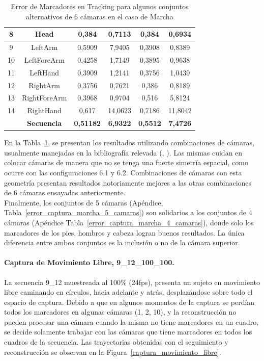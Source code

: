\begin{table}[ht!]
{\begin{tabular}{c|c|c|c|c|c|}
\multicolumn{1}{|c|}{8} & Head & 0,384 & 0,7113 & 0,384 & 0,6934 \\ \hline
\multicolumn{1}{|c|}{9} & LeftArm & 0,5909 & 7,9405 & 0,3908 & 0,8389 \\ \hline
\multicolumn{1}{|c|}{10} & LeftForeArm & 0,4258 & 1,7149 & 0,3895 & 0,9638 \\ \hline
\multicolumn{1}{|c|}{11} & LeftHand & 0,3909 & 1,2141 & 0,3756 & 1,0439 \\ \hline
\multicolumn{1}{|c|}{12} & RightArm & 0,3756 & 0,7621 & 0,386 & 0,8189 \\ \hline
\multicolumn{1}{|c|}{13} & RightForeArm & 0,3968 & 0,9704 & 0,516 & 5,8124 \\ \hline
\multicolumn{1}{|c|}{14} & RightHand & 0,617 & 14,0623 & 0,7186 & 11,8042 \\ \hline
 & \textbf{Secuencia} & \textbf{0,51182} & \textbf{6,9322} & \textbf{0,5512} & \textbf{7,4726} \\ \cline{2-6} 
\end{tabular}
}
\caption{Error de Marcadores en Tracking para algunos conjuntos alternativos de 6 cámaras en el caso de Marcha}
\label{error_captura_marcha_63_64_camaras}
\end{table}

En la Tabla~\ref{error_captura_marcha_63_64_camaras}, se presentan los resultados utilizando combinaciones de cámaras, usualmente manejadas en la bibliografía relevada (\cite{gross2001cmu}, \cite{humaneva}). Las mismas cuidan en colocar cámaras de manera que no se tenga una fuerte simetría espacial, como ocurre con las configuraciones 6.1 y 6.2. Combinaciones de cámaras con esta geometría presentan resultados notoriamente mejores a las otras combinaciones de 6 cámaras ensayadas anteriormente.
\\ 

Finalmente, los conjuntos de 5 cámaras (Apéndice, Tabla~\ref{error_captura_marcha_5_camaras}) son solidarios a los conjuntos de 4 cámaras (Apéndice Tabla~\ref{error_captura_marcha_4_camaras}), donde solo los marcadores de los pies, hombros y cabeza logran buenos resultados. La única diferencia entre ambos conjuntos es la inclusión o no de la cámara superior.

\paragraph{Captura de Movimiento Libre, 9\_12\_100\_100.} 

La secuencia 9\_12 muestreada al 100\% (24fps), presenta un sujeto en movimiento libre caminando en círculos, hacia adelante y atrás, desplazándose sobre todo el espacio de captura. Debido a que en algunos momentos de la captura se perdían todos los marcadores en algunas cámaras (1, 2, 10), y la reconstrucción no pueden procesar una cámara cuando la misma no tiene marcadores en un cuadro, se decide solamente trabajar con las cámaras que tiene marcadores en todos los cuadros de la secuencia. Las trayectorias obtenidas con el seguimiento y reconstrucción se observan en la Figura~\ref{captura_movimiento_libre}.

